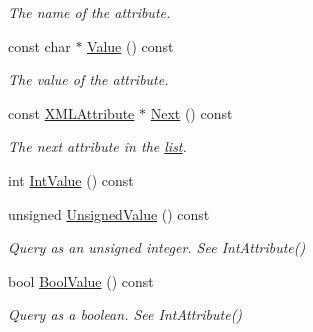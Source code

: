 \begin{DoxyCompactItemize}
\begin{DoxyCompactList}\small\item\em The name of the attribute. \end{DoxyCompactList}\item 
\mbox{\label{classtinyxml2_1_1XMLAttribute_a1aab1dd0e43ecbcfa306adbcf3a3d853}} 
const char $\ast$ \hyperlink{classtinyxml2_1_1XMLAttribute_a1aab1dd0e43ecbcfa306adbcf3a3d853}{Value} () const
\begin{DoxyCompactList}\small\item\em The value of the attribute. \end{DoxyCompactList}\item 
\mbox{\label{classtinyxml2_1_1XMLAttribute_aee53571b21e7ce5421eb929523a8bbe6}} 
const \hyperlink{classtinyxml2_1_1XMLAttribute}{X\+M\+L\+Attribute} $\ast$ \hyperlink{classtinyxml2_1_1XMLAttribute_aee53571b21e7ce5421eb929523a8bbe6}{Next} () const
\begin{DoxyCompactList}\small\item\em The next attribute in the \hyperlink{protocollist-p}{list}. \end{DoxyCompactList}\item 
int \hyperlink{classtinyxml2_1_1XMLAttribute_adfa2433f0fdafd5c3880936de9affa80}{Int\+Value} () const
\item 
\mbox{\label{classtinyxml2_1_1XMLAttribute_a0be5343b08a957c42c02c5d32c35d338}} 
unsigned \hyperlink{classtinyxml2_1_1XMLAttribute_a0be5343b08a957c42c02c5d32c35d338}{Unsigned\+Value} () const
\begin{DoxyCompactList}\small\item\em Query as an unsigned integer. See Int\+Attribute() \end{DoxyCompactList}\item 
\mbox{\label{classtinyxml2_1_1XMLAttribute_a98ce5207344ad33a265b0422addae1ff}} 
bool \hyperlink{classtinyxml2_1_1XMLAttribute_a98ce5207344ad33a265b0422addae1ff}{Bool\+Value} () const
\begin{DoxyCompactList}\small\item\em Query as a boolean. See Int\+Attribute() \end{DoxyCompactList}\item 

\end{DoxyCompactItemize}
